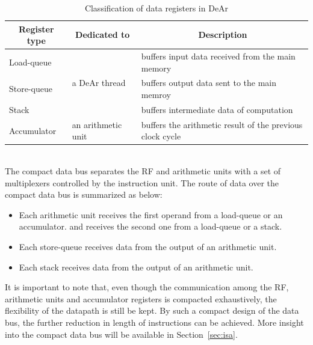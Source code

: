 \begin{table}[!ht]
    \caption{Classification of data registers in DeAr}
    \label{tab:register}
    \centering
    \begin{tabular}{|l|l|l|}
        \hline
        \multicolumn{1}{|c|}{\textbf{Register type}} & \multicolumn{1}{c|}{\textbf{Dedicated to}} & \multicolumn{1}{c|}{\textbf{Description}}                 \\ \hline
        Load-queue                                   & \multirow{3}{*}{a DeAr thread}             & buffers input data received from the main memory          \\ \cline{1-1} \cline{3-3} 
        Store-queue                                  &                                            & buffers output data sent to the main memroy               \\ \cline{1-1} \cline{3-3} 
        Stack                                        &                                            & buffers intermediate data of computation                  \\ \hline
        Accumulator                                  & an arithmetic unit                         & buffers the arithmetic result of the previous clock cycle \\ \hline
    \end{tabular}
\end{table}
\\\indent
The compact data bus separates the RF and arithmetic units with a set of multiplexers controlled by the instruction unit.
The route of data over the compact data bus is summarized as below:
\begin{itemize}
    \item Each arithmetic unit receives the first operand from a load-queue or an accumulator.
        and receives the second one from a load-queue or a stack.
    \item Each store-queue receives data from the output of an arithmetic unit.
    \item Each stack receives data from the output of an arithmetic unit.
\end{itemize}
It is important to note that, even though the communication among the RF, arithmetic units and accumulator registers is compacted exhaustively, 
the flexibility of the datapath is still be kept.
By such a compact design of the data bus, the further reduction in length of instructions can be achieved.
More insight into the compact data bus will be available in Section~\ref{sec:isa}.

